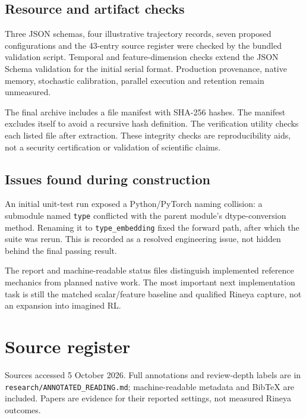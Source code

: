 \documentclass[
  11pt,
  a4paper,
]{article}
\begin{document}
\subsection{Resource and artifact
checks}\label{resource-and-artifact-checks}

Three JSON schemas, four illustrative trajectory records, seven proposed
configurations and the 43-entry source register were checked by the
bundled validation script. Temporal and feature-dimension checks extend
the JSON Schema validation for the initial serial format. Production
provenance, native memory, stochastic calibration, parallel execution
and retention remain unmeasured.

The final archive includes a file manifest with SHA-256 hashes. The
manifest excludes itself to avoid a recursive hash definition. The
verification utility checks each listed file after extraction. These
integrity checks are reproducibility aids, not a security certification
or validation of scientific claims.

\subsection{Issues found during
construction}\label{issues-found-during-construction}

An initial unit-test run exposed a Python/PyTorch naming collision: a
submodule named \texttt{type} conflicted with the parent module's
dtype-conversion method. Renaming it to \texttt{type\_embedding} fixed
the forward path, after which the suite was rerun. This is recorded as a
resolved engineering issue, not hidden behind the final passing result.

The report and machine-readable status files distinguish implemented
reference mechanics from planned native work. The most important next
implementation task is still the matched scalar/feature baseline and
qualified Rineya capture, not an expansion into imagined RL.

\clearpage

\section{Source register}\label{source-register}

Sources accessed 5 October 2026. Full annotations and review-depth
labels are in \texttt{research/ANNOTATED\_READING.md}; machine-readable
metadata and BibTeX are included. Papers are evidence for their reported
settings, not measured Rineya outcomes.
\end{document}
